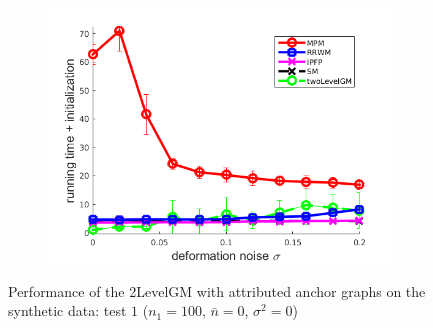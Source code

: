 \begin{figure}[h]
\begin{subfigure}[b]{0.31\textwidth}
		\includegraphics[scale=0.25]{"chapter3/fig/SyntheticTest/descr/Results_v4.3.3/Test2/time_summary_avg10t"} 
	\end{subfigure} 
	\caption[Performance of the 2LevelGM with attributed anchor graphs on the synthetic data (test $1$)]{Performance of the 2LevelGM with attributed anchor graphs on the synthetic data: test $1$ ($n_1=100$, $\bar{n}=0$, $\sigma^2=0$)}
	\label{fig:synTest1_descr_ver433}
\end{figure}
